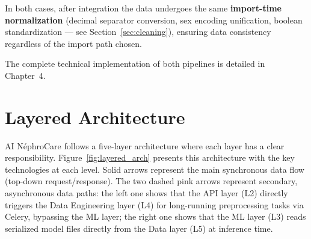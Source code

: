 \documentclass[12pt,a4paper,twoside]{report}
\begin{document}
In both cases, after integration the data undergoes the same \textbf{import-time normalization} (decimal separator conversion, sex encoding unification, boolean standardization — see Section~\ref{sec:cleaning}), ensuring data consistency regardless of the import path chosen.

The complete technical implementation of both pipelines is detailed in Chapter~4.

\section{Layered Architecture}\label{sec:layered}

AI NéphroCare follows a five-layer architecture where each layer has a clear responsibility. Figure~\ref{fig:layered_arch} presents this architecture with the key technologies at each level. Solid arrows represent the main synchronous data flow (top-down request/response). The two dashed pink arrows represent secondary, asynchronous data paths: the left one shows that the API layer (L2) directly triggers the Data Engineering layer (L4) for long-running preprocessing tasks via Celery, bypassing the ML layer; the right one shows that the ML layer (L3) reads serialized model files directly from the Data layer (L5) at inference time.
\end{document}
